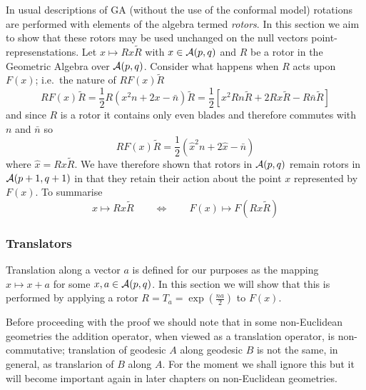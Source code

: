 In usual descriptions of GA (without the use of the conformal model)
rotations are performed with elements of the algebra termed
\emph{rotors}. In this section we aim to show that these rotors may be used
unchanged on the null vectors point-represenstations.
Let $x \mapsto Rx\tilde{R}$ with $x\in {\mathcal{A}}(p,q)$ and $R$ be a
rotor in the Geometric Algebra over ${\mathcal{A}}(p,q)$. Consider
what happens when $R$ acts upon $F(x)$; i.e.\ the nature of
$RF(x)\tilde{R}$
%
\[ RF(x)\tilde{R} =\frac{1}{2} R(x^2n + 2x - \bar{n})\tilde{R} =\frac{1}{2}[ x^2Rn\tilde{R}
+ 2Rx\tilde{R} - R\bar{n}\tilde{R}] \]
%
and since $R$ is a rotor it contains only even blades and therefore 
commutes with
$n$ and $\bar{n}$  
so
%
\begin{equation} RF(x)\tilde{R} = \frac{1}{2}(\hat{x}^2n + 2\hat{x} - \bar{n})
	\end{equation}
%
where $\hat{x}=R x \tilde{R}$. We have therefore shown that rotors in
${\mathcal{A}}(p,q)$ remain rotors in ${\mathcal{A}}(p+1,q+1)$ in that they retain
their action about the point $x$ represented by $F(x)$. To summarise
%
\begin{equation} x \mapsto Rx\tilde{R} \qquad \Leftrightarrow \qquad F(x) \mapsto
F(Rx\tilde{R}) \end{equation}
%

\subsubsection{Translators}

Translation along a vector $a$ is defined for our purposes as the
mapping $x\mapsto x+a$ for some $x,a \in \mathcal{A}(p,q)$.
In this
section we will show that this is performed by applying a 
rotor $R=T_a = \exp\left({\frac{na}{2}}\right)$ to $F(x)$.

Before proceeding with the proof we should note that in some non-Euclidean
geometries the addition operator, when viewed as a translation operator, is
non-commutative; translation of geodesic $A$ along geodesic $B$ is not the
same, in general, as translarion of $B$ along $A$. For the moment we shall
ignore this but it will become important again in later chapters on 
non-Euclidean geometries.

